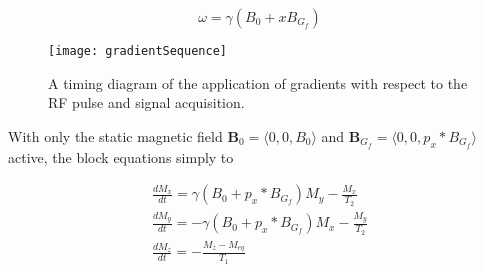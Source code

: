 \begin{displaymath}
  \omega = \gamma (B_0 + x B_{G_f})
\end{displaymath}




\begin{figure}
  \centering
  \texttt{[image: gradientSequence]}
  \caption{A timing diagram of the application of gradients with
    respect to the RF pulse and signal acquisition.}
  \label{fig:gradientSequence}
\end{figure}


With only the static magnetic field $\mathbf{B}_0 = \langle 0, 0, B_0
\rangle$ and $\mathbf{B}_{G_f} = \langle 0, 0, p_x * B_{G_f} \rangle$
active, the block equations simply to


\begin{displaymath}
  \begin{array}{l}
    \frac{dM_x}{dt} = \gamma (B_0 + p_x * B_{G_f}) M_y - \frac{M_x}{T_2} \\
    \frac{dM_y}{dt} = - \gamma (B_0 + p_x * B_{G_f}) M_x - \frac{M_y}{T_2} \\
    \frac{dM_z}{dt} = - \frac{M_z - M_{eq}}{T_1}
  \end{array}
\end{displaymath}




